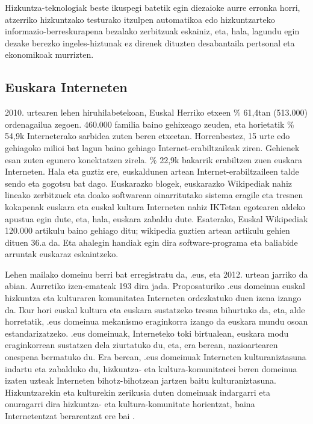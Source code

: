 \begin{multicols}{2}

Hizkuntza-teknologiak beste ikuspegi batetik egin diezaioke aurre erronka horri, atzerriko hizkuntzako testurako itzulpen automatikoa edo hizkuntzarteko informazio-berreskurapena bezalako zerbitzuak eskainiz, eta, hala, lagundu egin dezake berezko ingeles-hiztunak ez direnek dituzten desabantaila pertsonal eta ekonomikoak murrizten.

\subsection{Euskara Interneten}
    2010. urtearen lehen hiruhilabetekoan, Euskal Herriko etxeen \% 61,4tan (513.000) ordenagailua zegoen. 460.000 familia baino gehixeago zeuden, eta horietatik \% 54,9k Interneterako sarbidea zuten beren etxeetan. Horrenbestez, 15 urte edo gehiagoko milioi bat lagun baino gehiago Internet-erabiltzaileak ziren. Gehienek esan zuten egunero konektatzen zirela. \% 22,9k bakarrik erabiltzen zuen euskara Interneten.  Hala eta guztiz ere, euskaldunen artean Internet-erabiltzaileen talde sendo eta gogotsu bat dago. Euskarazko blogek, euskarazko Wikipediak nahiz lineako zerbitzuek eta doako softwarean oinarritutako sistema eragile eta tresnen kokapenak euskara eta euskal kultura Interneten nahiz IKTetan egotearen aldeko apustua egin dute, eta, hala, euskara zabaldu dute. Esaterako, Euskal Wikipediak 120.000 artikulu baino gehiago ditu; wikipedia guztien artean artikulu gehien dituen 36.a da. Eta ahalegin handiak egin dira software-programa  \cite{BAS-Nota17,BAS-Nota18}  eta baliabide arruntak  \cite{BAS-Nota19,BAS-Nota20,BAS-Nota21,BAS-Nota22,BAS-Nota22b}   euskaraz eskaintzeko.


Lehen mailako domeinu berri bat erregistratu da, .eus, eta 2012. urtean jarriko da abian. Aurretiko izen-emateak 193 dira jada. Proposaturiko .eus domeinua euskal hizkuntza eta kulturaren komunitatea Interneten ordezkatuko duen izena izango da. Ikur hori euskal kultura eta euskara sustatzeko tresna bihurtuko da, eta, alde horretatik, .eus domeinua mekanismo eraginkorra izango da euskara mundu osoan estandarizatzeko. .eus domeinuak, Interneteko toki birtualean, euskara modu eraginkorrean sustatzen dela ziurtatuko du, eta, era berean, nazioartearen onespena bermatuko du. Era berean, .eus domeinuak Interneten kulturaniztasuna indartu eta zabalduko du, hizkuntza- eta kultura-komunitateei beren domeinua izaten uzteak Interneten bihotz-bihotzean jartzen baitu kulturaniztasuna. Hizkuntzarekin eta kulturekin zerikusia duten domeinuak indargarri eta onuragarri dira hizkuntza- eta kultura-komunitate horientzat, baina Internetentzat berarentzat ere bai \cite{BAS-Nota23}. 


\end{multicols}
